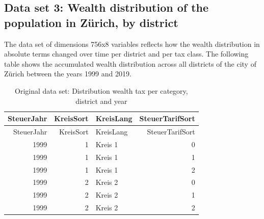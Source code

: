 \documentclass[
]{article}
\begin{document}
\pagebreak

\hypertarget{data-set-3-wealth-distribution-of-the-population-in-zuxfcrich-by-district}{%
\subsection{Data set 3: Wealth distribution of the population in Zürich,
by
district}\label{data-set-3-wealth-distribution-of-the-population-in-zuxfcrich-by-district}}

The data set of dimensions 756x8 variables reflects how the wealth
distribution in absolute terms changed over time per district and per
tax class. The following table shows the accumulated wealth distribution
across all districts of the city of Zürich between the years 1999 and
2019.

\begin{longtable}[]{@{}rrlr@{}}
\caption{Original data set: Distribution wealth tax per category,
district and year}\tabularnewline
\toprule
SteuerJahr & KreisSort & KreisLang & SteuerTarifSort \\
\midrule
\endfirsthead
\toprule
SteuerJahr & KreisSort & KreisLang & SteuerTarifSort \\
\midrule
\endhead
1999 & 1 & Kreis 1 & 0 \\
1999 & 1 & Kreis 1 & 1 \\
1999 & 1 & Kreis 1 & 2 \\
1999 & 2 & Kreis 2 & 0 \\
1999 & 2 & Kreis 2 & 1 \\
1999 & 2 & Kreis 2 & 2 \\
\bottomrule
\end{longtable}
\end{document}
